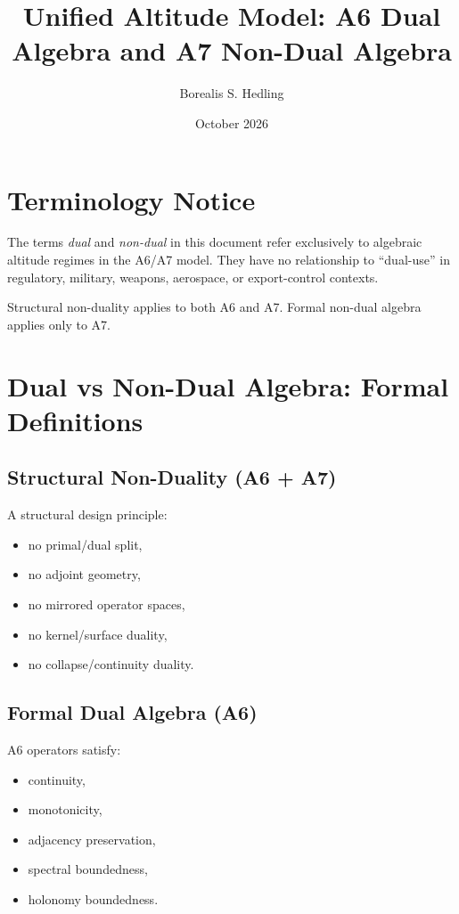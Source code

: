 \documentclass[11pt]{article}
\title{Unified Altitude Model: A6 Dual Algebra and A7 Non-Dual Algebra}
\author{Borealis S. Hedling}
\date{October 2026}
\begin{document}
\maketitle

\section*{Terminology Notice}

The terms \emph{dual} and \emph{non-dual} in this document refer exclusively to
algebraic altitude regimes in the A6/A7 model. They have no relationship to
“dual-use” in regulatory, military, weapons, aerospace, or export-control
contexts.

Structural non-duality applies to both A6 and A7.  
Formal non-dual algebra applies only to A7.

\section{Dual vs Non-Dual Algebra: Formal Definitions}

\subsection{Structural Non-Duality (A6 + A7)}
A structural design principle:
\begin{itemize}
  \item no primal/dual split,
  \item no adjoint geometry,
  \item no mirrored operator spaces,
  \item no kernel/surface duality,
  \item no collapse/continuity duality.
\end{itemize}

\subsection{Formal Dual Algebra (A6)}
A6 operators satisfy:
\begin{itemize}
  \item continuity,
  \item monotonicity,
  \item adjacency preservation,
  \item spectral boundedness,
  \item holonomy boundedness.
\end{itemize}
\end{document}
